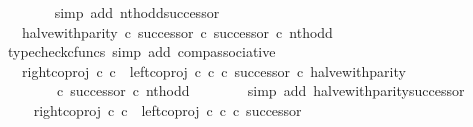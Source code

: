 \begin{isabellebody}
\ \ \ \ \ \ \isamarkupfalse%
\ {\isacharparenleft}{\kern0pt}simp\ add{\isacharcolon}{\kern0pt}\ nth{\isacharunderscore}{\kern0pt}odd{\isacharunderscore}{\kern0pt}successor{\isacharparenright}{\kern0pt}\isanewline
\ \ \ \ \isamarkupfalse%
\ \isamarkupfalse%
\ {\isachardoublequoteopen}{\isachardot}{\kern0pt}{\isachardot}{\kern0pt}{\isachardot}{\kern0pt}\ {\isacharequal}{\kern0pt}\ {\isacharparenleft}{\kern0pt}{\isacharparenleft}{\kern0pt}halve{\isacharunderscore}{\kern0pt}with{\isacharunderscore}{\kern0pt}parity\ {\isasymcirc}\isactrlsub c\ successor{\isacharparenright}{\kern0pt}\ {\isasymcirc}\isactrlsub c\ successor{\isacharparenright}{\kern0pt}\ {\isasymcirc}\isactrlsub c\ nth{\isacharunderscore}{\kern0pt}odd{\isachardoublequoteclose}\isanewline
\ \ \ \ \ \ \isamarkupfalse%
\ {\isacharparenleft}{\kern0pt}typecheck{\isacharunderscore}{\kern0pt}cfuncs{\isacharcomma}{\kern0pt}\ simp\ add{\isacharcolon}{\kern0pt}\ comp{\isacharunderscore}{\kern0pt}associative{}{\isacharparenright}{\kern0pt}\isanewline
\ \ \ \ \isamarkupfalse%
\ \isamarkupfalse%
\ {\isachardoublequoteopen}{\isachardot}{\kern0pt}{\isachardot}{\kern0pt}{\isachardot}{\kern0pt}\ {\isacharequal}{\kern0pt}\ {\isacharparenleft}{\kern0pt}{\isacharparenleft}{\kern0pt}right{\isacharunderscore}{\kern0pt}coproj\ {\isasymnat}\isactrlsub c\ {\isasymnat}\isactrlsub c\ {\isasymamalg}\ {\isacharparenleft}{\kern0pt}left{\isacharunderscore}{\kern0pt}coproj\ {\isasymnat}\isactrlsub c\ {\isasymnat}\isactrlsub c\ {\isasymcirc}\isactrlsub c\ successor{\isacharparenright}{\kern0pt}\ {\isasymcirc}\isactrlsub c\ halve{\isacharunderscore}{\kern0pt}with{\isacharunderscore}{\kern0pt}parity{\isacharparenright}{\kern0pt}\ \isanewline
\ \ \ \ \ \ \ \ {\isasymcirc}\isactrlsub c\ successor{\isacharparenright}{\kern0pt}\ {\isasymcirc}\isactrlsub c\ nth{\isacharunderscore}{\kern0pt}odd{\isachardoublequoteclose}\isanewline
\ \ \ \ \ \ \isamarkupfalse%
\ {\isacharparenleft}{\kern0pt}simp\ add{\isacharcolon}{\kern0pt}\ halve{\isacharunderscore}{\kern0pt}with{\isacharunderscore}{\kern0pt}parity{\isacharunderscore}{\kern0pt}successor{\isacharparenright}{\kern0pt}\isanewline
\ \ \ \ \isamarkupfalse%
\ \isamarkupfalse%
\ {\isachardoublequoteopen}{\isachardot}{\kern0pt}{\isachardot}{\kern0pt}{\isachardot}{\kern0pt}\ {\isacharequal}{\kern0pt}\ {\isacharparenleft}{\kern0pt}right{\isacharunderscore}{\kern0pt}coproj\ {\isasymnat}\isactrlsub c\ {\isasymnat}\isactrlsub c\ {\isasymamalg}\ {\isacharparenleft}{\kern0pt}left{\isacharunderscore}{\kern0pt}coproj\ {\isasymnat}\isactrlsub c\ {\isasymnat}\isactrlsub c\ {\isasymcirc}\isactrlsub c\ successor{\isacharparenright}{\kern0pt}\isanewline

\end{isabellebody}
